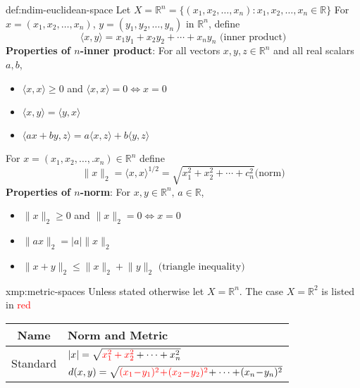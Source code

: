 \documentclass[landscape, 8pt]{extarticle}
\begin{document}
\begin{multicols}{3}
\vspace{-5pt}
\setcounter{subsection}{1}

\begin{dfn}{def:ndim-euclidean-space}{}
    \vspace{-5pt}
    Let $X = \mathbb{R}^{n} = \{(x_{1},x_{2},\dots,x_{n}) : x_{1},x_{2},\dots,x_{n}\in\mathbb{R}\}$
    \newline
    For $x = (x_{1},x_{2},\dots,x_{n})$, $y=(y_{1},y_{2},\dots,y_{n})$ in $\mathbb{R}^{n}$, define
    \[\langle x,y \rangle = x_{1}y_{1} + x_{2}y_{2} + \cdots + x_{n}y_{n} \text{ (inner product)}\]
    \textbf{Properties of $n$-inner product}: For all vectors $x,y,z\in\mathbb{R}^{n}$ and all real scalars $a,b$,
    \begin{itemize}
        \item $\langle x,x \rangle\ge 0$ and $\langle x,x \rangle=0 \iff x = 0$
        \item $\langle x,y \rangle = \langle y,x \rangle$
        \item $\langle ax+by,z \rangle = a\langle x,z \rangle + b\langle y,z \rangle$
    \end{itemize}
    For $x = (x_{1},x_{2},\dots,.x_{n})\in\mathbb{R}^{n}$ define
    \[\lVert x \rVert_{2} = \langle x,x \rangle^{1/2} = \sqrt{x^{2}_{1} + x^{2}_{2} + \cdots + c^{2}_{n}}\text{(norm)}\]
    \textbf{Properties of $n$-norm}: For $x,y\in\mathbb{R}^{n},\,a\in\mathbb{R}$,
    \begin{itemize}
        \item $\lVert x \rVert_{2}\ge 0$ and $\lVert x \rVert_{2}=0 \iff x = 0$
        \item $\lVert ax \rVert_{2}=\lvert a \rvert\lVert x \rVert_{2}$
        \item $\lVert x+y \rVert_{2}\le \lVert x \rVert_{2} + \lVert y \rVert_{2}\text{ (triangle inequality)}$
    \end{itemize}
\end{dfn}
\vspace{-5pt}

\begin{xmp}{xmp:metric-spaces}{}
    \vspace{-5pt}
    Unless stated otherwise let $X = \mathbb{R}^{n}$. The case $X = \mathbb{R}^{2}$ is listed in \textcolor{red}{red}

    \def\arraystretch{1.5}
    \begin{center}
        \begin{tabular}{|c|l|}
        \hline
        Name & Norm and Metric \\
        \hline
        \multirow{2}{*}{Standard} & $\lvert x \rvert = \sqrt{\textcolor{red}{x^{2}_{1} + x^{2}_{2}} + \cdots + x^{2}_{n}}$ \\
        & $d(x, y) = \sqrt{\textcolor{red}{(x_{1} \! - \! y_{1})^{2} \! + \! (x_{2} \! - \! y_{2})^{2}} \! + \cdots + \! (x_{n} \! - \! y_{n})^{2}}$ \\


\end{tabular}
\end{center}
\end{xmp}
\end{multicols}
\end{document}
